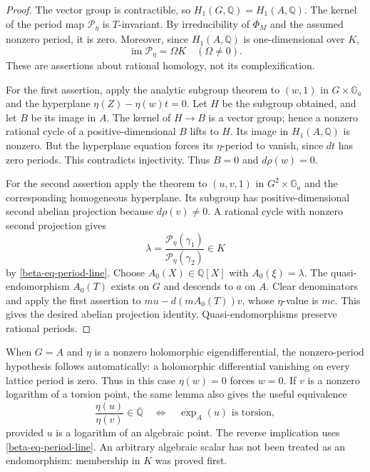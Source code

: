 \documentclass[11pt,a4paper]{article}
\theoremstyle{definition}
\theoremstyle{remark}
\numberwithin{equation}{section}
\begin{document}
\begin{proof}
The vector group is contractible, so $H_1(G,\mathbb Q)=H_1(A,\mathbb Q)$.
The kernel of the period map $\mathcal P_\eta$ is $T$-invariant.  By
irreducibility of $\Phi_M$ and the assumed nonzero period, it is zero.
Moreover, since $H_1(A,\mathbb Q)$ is one-dimensional over $K$,
\begin{equation}\label{beta-eq-period-line}
\operatorname{im}\mathcal P_\eta=\Omega K\quad(\Omega\ne0).
\end{equation}
These are assertions about rational homology, not its complexification.

For the first assertion, apply the analytic subgroup theorem to $(w,1)$
in $G\times\mathbb G_a$ and the hyperplane
$\eta(Z)-\eta(w)t=0$.  Let $H$ be the subgroup obtained, and let $B$ be
its image in $A$.  The kernel of $H\to B$ is a vector group; hence a
nonzero rational cycle of a positive-dimensional $B$ lifts to $H$.
Its image in $H_1(A,\mathbb Q)$ is nonzero.  But the hyperplane equation
forces its $\eta$-period to vanish, since $dt$ has zero periods.
This contradicts injectivity.  Thus $B=0$ and $d\rho(w)=0$.

For the second assertion apply the theorem to $(u,v,1)$ in
$G^2\times\mathbb G_a$ and the corresponding homogeneous hyperplane.
Its subgroup has positive-dimensional second abelian projection because
$d\rho(v)\ne0$.  A rational cycle with nonzero second projection gives
\[
\lambda=
\frac{\mathcal P_\eta(\gamma_1)}{\mathcal P_\eta(\gamma_2)}\in K
\]
by \eqref{beta-eq-period-line}.  Choose $A_0(X)\in\mathbb Q[X]$ with
$A_0(\xi)=\lambda$.  The quasi-endomorphism $A_0(T)$ exists on $G$ and
descends to $a$ on $A$.  Clear denominators and apply the first assertion
to $m u-d(mA_0(T))v$, whose $\eta$-value is $mc$.  This gives the desired
abelian projection identity.  Quasi-endomorphisms preserve rational
periods.
\end{proof}

When $G=A$ and $\eta$ is a nonzero holomorphic eigendifferential, the
nonzero-period hypothesis follows automatically: a holomorphic
differential vanishing on every lattice period is zero.  Thus in this
case $\eta(w)=0$ forces $w=0$.  If $v$ is a nonzero logarithm of a torsion
point, the same lemma also gives the useful equivalence
\begin{equation}\label{beta-eq-ratio-torsion}
\frac{\eta(u)}{\eta(v)}\in\overline{\mathbb Q}
\quad\Longleftrightarrow\quad
\exp_A(u)\text{ is torsion},
\end{equation}
provided $u$ is a logarithm of an algebraic point.  The reverse implication
uses \eqref{beta-eq-period-line}.  An arbitrary algebraic scalar has not
been treated as an endomorphism: membership in $K$ was proved first.
\end{document}
